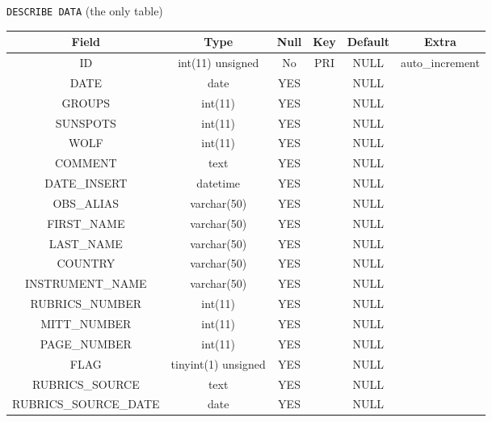 \documentclass[12pt]{article}
\begin{document}
{\centering
    \caption{\texttt{DESCRIBE DATA} (the only table)}
    \begin{tabular}{c|c|c|c|c|c}%
        \textbf{Field} & \textbf{Type} & \textbf{Null} & \textbf{Key} & \textbf{Default} & \textbf{Extra}  \\
        \hline
        ID & int(11) unsigned & No & PRI & NULL & auto\_increment \\
        
        DATE & date & YES && NULL & \\
        
        GROUPS & int(11) & YES && NULL &  \\
        
        SUNSPOTS & int(11) & YES && NULL & \\
        
        WOLF & int(11) & YES && NULL &  \\
        
        COMMENT & text & YES && NULL &  \\
        
        DATE\_INSERT & datetime & YES && NULL &  \\
        
        OBS\_ALIAS & varchar(50) & YES && NULL & \\
        
        FIRST\_NAME & varchar(50) & YES && NULL & \\
        
        LAST\_NAME & varchar(50) & YES && NULL & \\
        
        COUNTRY & varchar(50) & YES && NULL & \\
        
        INSTRUMENT\_NAME & varchar(50) & YES && NULL & \\
        
        RUBRICS\_NUMBER & int(11) & YES && NULL & \\
        
        MITT\_NUMBER & int(11) & YES && NULL & \\
        
        PAGE\_NUMBER & int(11) & YES && NULL & \\
        
        FLAG & tinyint(1) unsigned & YES && NULL &  \\
        
        RUBRICS\_SOURCE & text & YES && NULL & \\
        
        RUBRICS\_SOURCE\_DATE & date & YES && NULL & \\
        
    \end{tabular}
    \label{tab:data-og}
\par}
\end{document}
